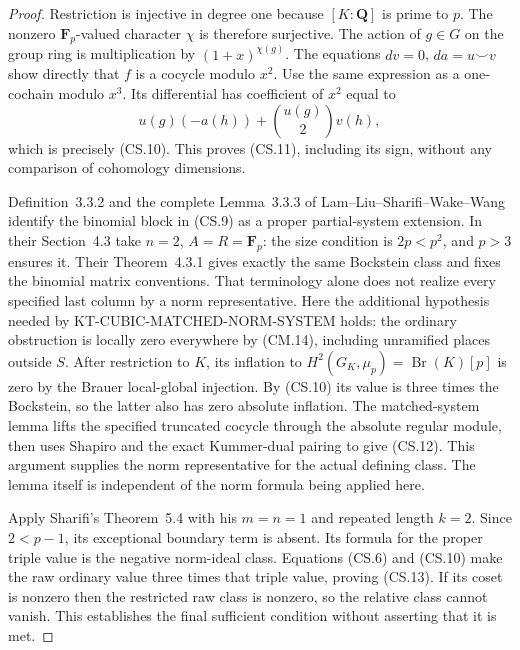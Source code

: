 \documentclass[11pt,a4paper]{article}
\theoremstyle{definition}
\begin{document}
\begin{proof}
Restriction is injective in degree one because
\([K:\mathbf Q]\) is prime to \(p\).  The nonzero
\(\mathbf F_p\)-valued character \(\chi\) is therefore
surjective.  The action of \(g\in G\) on the group
ring is multiplication by \((1+x)^{\chi(g)}\).
The equations \(dv=0\), \(da=u\smile v\) show
directly that \(f\) is a cocycle modulo \(x^2\).
Use the same expression as a one-cochain modulo \(x^3\).
Its differential has coefficient of \(x^2\) equal to
\[
 u(g)(-a(h))+\binom{u(g)}2v(h),
                                                               \tag{CS.14}
\]
which is precisely (CS.10).  This proves (CS.11),
including its sign, without any comparison of
cohomology dimensions.

Definition~3.3.2 and the complete Lemma~3.3.3 of
Lam--Liu--Sharifi--Wake--Wang identify the binomial
block in (CS.9) as a proper partial-system extension.
In their Section~4.3 take \(n=2\), \(A=R=\mathbf F_p\):
the size condition is \(2p<p^2\), and \(p>3\)
ensures it.  Their Theorem~4.3.1 gives exactly the
same Bockstein class and fixes the binomial matrix
conventions.  That terminology alone does not
realize every specified last column by a norm
representative.  Here the additional hypothesis
needed by KT-CUBIC-MATCHED-NORM-SYSTEM holds:
the ordinary obstruction is locally zero everywhere
by (CM.14), including unramified places outside
\(S\).  After restriction to \(K\), its inflation
to \(H^2(G_K,\mu_p)=\operatorname{Br}(K)[p]\)
is zero by the Brauer local-global injection.
By (CS.10) its value is three times the Bockstein,
so the latter also has zero absolute inflation.
The matched-system lemma lifts the specified
truncated cocycle through the absolute regular
module, then uses Shapiro and the exact Kummer-dual
pairing to give (CS.12).  This argument supplies
the norm representative for the actual defining
class.  The lemma itself is independent of the
norm formula being applied here.

Apply Sharifi's Theorem~5.4 with his \(m=n=1\)
and repeated length \(k=2\).  Since \(2<p-1\),
its exceptional boundary term is absent.  Its
formula for the proper triple value is the
negative norm-ideal class.  Equations (CS.6)
and (CS.10) make the raw ordinary value three
times that triple value, proving (CS.13).
If its coset is nonzero then the restricted raw
class is nonzero, so the relative class cannot
vanish.  This establishes the final sufficient
condition without asserting that it is met.
\end{proof}
\end{document}
